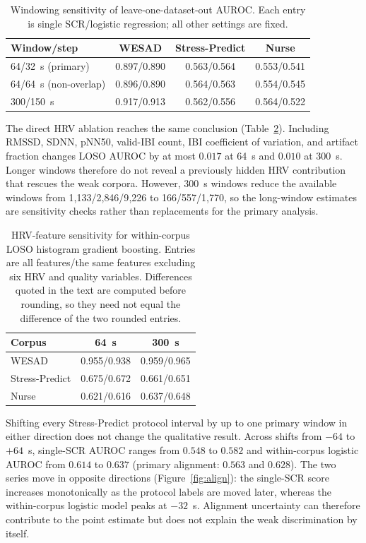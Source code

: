\documentclass[healthcare,article,submit,moreauthors,pdftex]{Definitions/mdpi}
\begin{document}
\begin{table}[H]
\centering
\caption{Windowing sensitivity of leave-one-dataset-out AUROC. Each entry is
single SCR/logistic regression; all other settings are fixed.
\label{tab:window_sens}}
\begin{tabular}{lccc}
\toprule
\textbf{Window/step} & \textbf{WESAD} & \textbf{Stress-Predict} & \textbf{Nurse} \\
\midrule
64/32~s (primary) & 0.897/0.890 & 0.563/0.564 & 0.553/0.541 \\
64/64~s (non-overlap) & 0.896/0.890 & 0.564/0.563 & 0.554/0.545 \\
300/150~s & 0.917/0.913 & 0.562/0.556 & 0.564/0.522 \\
\bottomrule
\end{tabular}
\end{table}

The direct HRV ablation reaches the same conclusion
(Table~\ref{tab:hrv_sens}). Including RMSSD, SDNN, pNN50, valid-IBI count,
IBI coefficient of variation, and artifact fraction changes LOSO AUROC by at most $0.017$ at
64~s and $0.010$ at 300~s. Longer windows therefore do not reveal a previously
hidden HRV contribution that rescues the weak corpora. However, 300~s windows
reduce the available windows from 1{,}133/2{,}846/9{,}226 to
166/557/1{,}770, so the long-window estimates are sensitivity checks rather than
replacements for the primary analysis.

\begin{table}[H]
\centering
\caption{HRV-feature sensitivity for within-corpus LOSO histogram gradient
boosting. Entries are all features/the same features excluding six HRV and
quality variables. Differences quoted in the text are computed before rounding,
so they need not equal the difference of the two rounded entries.\label{tab:hrv_sens}}
\begin{tabular}{lcc}
\toprule
\textbf{Corpus} & \textbf{64~s} & \textbf{300~s} \\
\midrule
WESAD          & 0.955/0.938 & 0.959/0.965 \\
Stress-Predict & 0.675/0.672 & 0.661/0.651 \\
Nurse          & 0.621/0.616 & 0.637/0.648 \\
\bottomrule
\end{tabular}
\end{table}

Shifting every Stress-Predict protocol interval by up to one primary window in
either direction does not change the qualitative result. Across shifts from
$-64$ to $+64$~s, single-SCR AUROC ranges from $0.548$ to $0.582$ and
within-corpus logistic AUROC from $0.614$ to $0.637$ (primary alignment:
$0.563$ and $0.628$). The two series move in opposite directions
(Figure~\ref{fig:align}): the single-SCR score increases monotonically as the
protocol labels are moved later, whereas the within-corpus logistic model peaks
at $-32$~s. Alignment uncertainty can therefore contribute to the point estimate
but does not explain the weak discrimination by itself.
\end{document}
